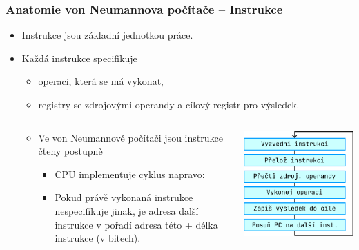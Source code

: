 \documentclass[aspectratio=169,11pt,svgnames]{beamer}
\begin{document}
\begin{frame}
 \frametitle{Anatomie von Neumannova počítače -- Instrukce}
 \begin{itemize}[label=\textbullet]
  \item Instrukce jsou základní jednotkou práce.\pause
  \item Každá instrukce specifikuje
  \begin{itemize}[label=\textemdash]
   \item \alert{operaci}, která se má vykonat,\pause
   \item registry se zdrojovými \alert{operandy} a \alert{cílový registr} pro
    výsledek.
  \end{itemize}
  \begin{columns}[T]
   \begin{column}{.65\textwidth}
    \begin{itemize}[label=\textbullet]
     \item Ve von Neumannově počítači jsou instrukce čteny postupně
     \pause
     \begin{itemize}[label=\textemdash]
      \item CPU implementuje cyklus napravo:
      \item Pokud právě vykonaná instrukce nespecifikuje jinak, je adresa další
       instrukce v pořadí adresa této + délka instrukce (v bitech).
     \end{itemize}
    \end{itemize}
   \end{column}
   \begin{column}{.29\textwidth}
    \begin{center}
     \includegraphics[width=\textwidth]{instruction-reading.pdf}
    \end{center}
   \end{column}
  \end{columns}
 \end{itemize}
\end{frame}
\end{document}
